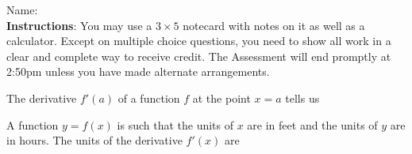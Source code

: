 \documentclass[addpoints]{exam}
\begin{document}
		
\vspace*{0pt}

\noindent
Name: \underline{\hspace{2in}} \\


\noindent
\textbf{Instructions}:  You may use a $3 \times 5$ notecard with notes on it as well as a calculator. Except on multiple choice questions, you need to show all work in a clear and complete way to receive credit. The Assessment will end promptly at 2:50pm unless you have made alternate arrangements. 

\begin{questions}


\question[2] The derivative $f'(a)$ of a function $f$ at the point $x=a$ tells us

\question[2] A function $y = f(x)$ is such that the units of $x$ are in feet and the units of $y$ are in hours. The units of the derivative $f'(x)$ are 
\end{questions}
\end{document}
